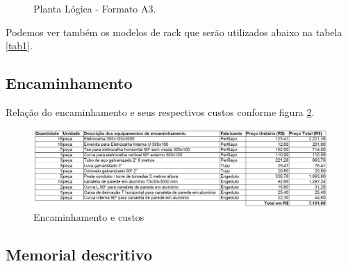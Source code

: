 \documentclass[	DIV=calc,%
							paper=a4,%
							fontsize=12pt,%
							onecolumn]{scrartcl}	 					%
\begin{document}

\clearpage
\thispagestyle{plain}

\recalctypearea

\begin{figure}
	\noindent{}
	\caption{Planta Lógica - Formato A3.}
	\label{figura3}
\end{figure}

\clearpage
{}
\recalctypearea




Podemos ver também os modelos de rack que serão utilizados abaixo na tabela \ref{tab1}.



\subsection{Encaminhamento}

Relação do encaminhamento e seus respectivos custos conforme figura \ref{figura4}.  
\begin{figure}[H]
	\centering
	\includegraphics[width=\textwidth]{figura4}
	\caption{Encaminhamento e custos}
	\label{figura4}
\end{figure}

 
\subsection{Memorial descritivo}
\end{document}
